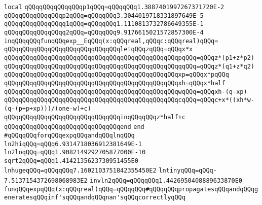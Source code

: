 \newline
\verb|local|\newline
\verb|qQQqqQQqqQQqqQQqp1qQQq=qQQqqQQq1.3887401997267371720E-2|\newline
\verb|qQQqqQQqqQQqqQQqp2qQQq=qQQqqQQq3.3044019718331897649E-5|\newline
\verb|qQQqqQQqqQQqqQQqq1qQQq=qQQqqQQq1.1110813732786649355E-1|\newline
\verb|qQQqqQQqqQQqqQQqq2qQQq=qQQqqQQq9.9176615021572857300E-4|\newline
\verb|inqQQqqQQqfunqQQqexp__EqQQq(x:qQQqreal,qQQqc:qQQqreal)qQQq=|\newline
\verb|qQQqqQQqqQQqqQQqqQQqqQQqqQQqqQQqletqQQqzqQQq=qQQqx*x|\newline
\verb|qQQqqQQqqQQqqQQqqQQqqQQqqQQqqQQqqQQqqQQqqQQqqQQqpqQQq=qQQqz*(p1+z*p2)|\newline
\verb|qQQqqQQqqQQqqQQqqQQqqQQqqQQqqQQqqQQqqQQqqQQqqQQqqqQQq=qQQqz*(q1+z*q2)|\newline
\verb|qQQqqQQqqQQqqQQqqQQqqQQqqQQqqQQqqQQqqQQqqQQqqQQqxp=qQQqx*pqQQq|\newline
\verb|qQQqqQQqqQQqqQQqqQQqqQQqqQQqqQQqqQQqqQQqqQQqqQQqxh=qQQqx*half|\newline
\verb|qQQqqQQqqQQqqQQqqQQqqQQqqQQqqQQqqQQqqQQqqQQqqQQqwqQQq=qQQqxh-(q-xp)|\newline
\verb|qQQqqQQqqQQqqQQqqQQqqQQqqQQqqQQqqQQqqQQqqQQqqQQqcqQQq=qQQqc+x*((xh*w-(q-(p+p+xp)))/(one-w)+c)|\newline
\verb|qQQqqQQqqQQqqQQqqQQqqQQqqQQqqQQqinqQQqqQQqz*half+c|\newline
\verb|qQQqqQQqqQQqqQQqqQQqqQQqqQQqqQQqend|\newline
\verb|end|\newline
\newline
\verb|#qQQqqQQqforqQQqexpqQQqandqQQqlnqQQq|\newline
\verb|ln2hiqQQq=qQQq6.9314718036912381649E-1|\newline
\verb|ln2loqQQq=qQQq1.9082149292705877000E-10|\newline
\verb|sqrt2qQQq=qQQq1.4142135623730951455E0|\newline
\verb|lnhugeqQQq=qQQqqQQq7.1602103751842355450E2|\newline
\verb|lntinyqQQq=qQQq-7.5137154372698068983E2|\newline
\verb|invln2qQQq=qQQqqQQq1.4426950408889633870E0|\newline
\newline
\verb|funqQQqexpqQQq(x:qQQqreal)qQQq=qQQqqQQq#qQQqqQQqpropagatesqQQqandqQQqgeneratesqQQqinf'sqQQqandqQQqnan'sqQQqcorrectlyqQQq|\newline
